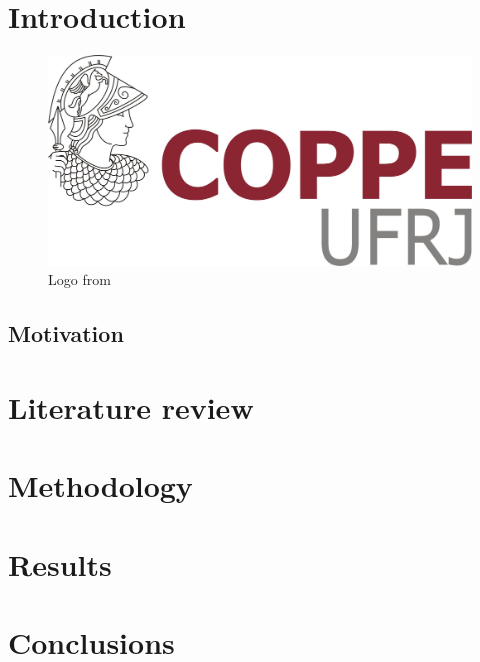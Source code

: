 \documentclass[msc,fleqn,english]{coppe}
\begin{document}
	
	\tableofcontents
	\listoffigures
	\listoftables
	\printlosymbols
	\printloabbreviations
	\mainmatter
	
\chapter{Introduction}
\lipsum

\begin{figure}[!htb]
	\includegraphics[width=\textwidth]{coppe-logo.jpg}
	\caption{Logo from \CoppeTeX}
\end{figure}

	
\section{Motivation}
\lipsum

\chapter{Literature review}

\chapter{Methodology}
	
\chapter{Results}
	
\chapter{Conclusions}
	
	
	
\end{document}
